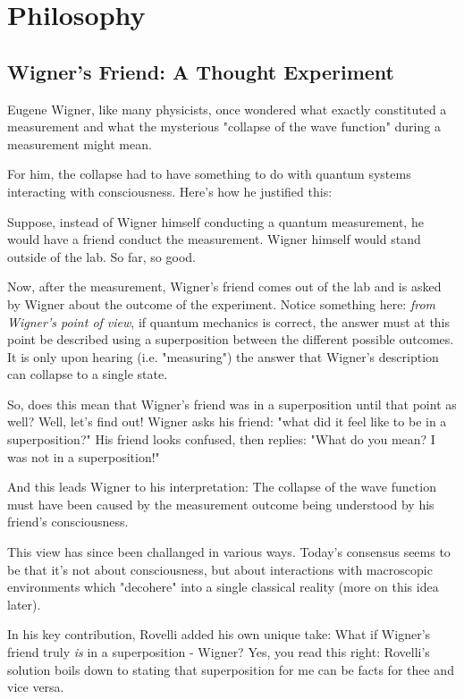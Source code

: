\documentclass{article}
\begin{document}
\section{Philosophy}

\subsection{Wigner's Friend: A Thought Experiment}

Eugene Wigner, like many physicists, once wondered what exactly constituted a measurement and what the mysterious "collapse of the wave function" during a measurement might mean.

For him, the collapse had to have something to do with quantum systems interacting with consciousness. Here's how he justified this:

Suppose, instead of Wigner himself conducting a quantum measurement, he would have a friend conduct the measurement. Wigner himself would stand outside of the lab. So far, so good.

Now, after the measurement, Wigner's friend comes out of the lab and is asked by Wigner about the outcome of the experiment. Notice something here: \textit{from Wigner's point of view}, if quantum mechanics is correct, the answer must at this point be described using a superposition between the different possible outcomes. It is only upon hearing (i.e. "measuring") the answer that Wigner's description can collapse to a single state.

So, does this mean that Wigner's friend was in a superposition until that point as well? Well, let's find out! Wigner asks his friend: "what did it feel like to be in a superposition?" His friend looks confused, then replies: "What do you mean? I was not in a superposition!"

And this leads Wigner to his interpretation: The collapse of the wave function must have been caused by the measurement outcome being understood by his friend's consciousness.

This view has since been challanged in various ways. Today's consensus seems to be that it's not about consciousness, but about interactions with macroscopic environments which "decohere" into a single classical reality (more on this idea later).

In his key contribution, Rovelli added his own unique take: What if Wigner's friend truly \textit{is} in a superposition -  Wigner? Yes, you read this right: Rovelli's solution boils down to stating that superposition for me can be facts for thee and vice versa.
\end{document}

